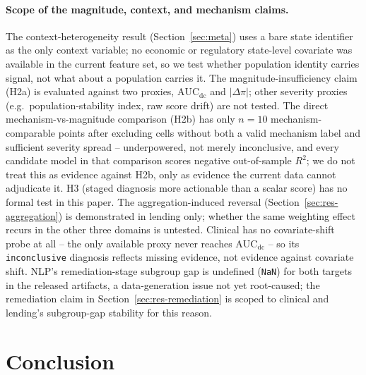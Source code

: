 \documentclass[11pt]{article}
\begin{document}
\paragraph{Scope of the magnitude, context, and mechanism claims.} The context-heterogeneity result
(Section~\ref{sec:meta}) uses a bare state identifier as the only context variable; no economic or
regulatory state-level covariate was available in the current feature set, so we test whether
population identity carries signal, not what about a population carries it. The
magnitude-insufficiency claim (H2a) is evaluated against two proxies,
$\text{AUC}_{\text{dc}}$ and $|\Delta\pi|$; other severity proxies (e.g.\ population-stability
index, raw score drift) are not tested. The direct mechanism-vs-magnitude comparison (H2b) has only
$n=10$ mechanism-comparable points after excluding cells without both a valid mechanism label and
sufficient severity spread -- underpowered, not merely inconclusive, and every candidate model in
that comparison scores negative out-of-sample $R^2$; we do not treat this as evidence against H2b,
only as evidence the current data cannot adjudicate it. H3 (staged diagnosis more actionable than a
scalar score) has no formal test in this paper. The aggregation-induced reversal
(Section~\ref{sec:res-aggregation}) is demonstrated in lending only; whether the same weighting
effect recurs in the other three domains is untested. Clinical has no covariate-shift probe at all
-- the only available proxy never reaches $\text{AUC}_{\text{dc}}$ -- so its \texttt{inconclusive}
diagnosis reflects missing evidence, not evidence against covariate shift. NLP's remediation-stage
subgroup gap is undefined (\texttt{NaN}) for both targets in the released artifacts, a
data-generation issue not yet root-caused; the remediation claim in
Section~\ref{sec:res-remediation} is scoped to clinical and lending's subgroup-gap stability for
this reason.

\section{Conclusion}\label{sec:conclusion}
\end{document}
